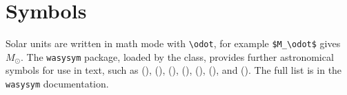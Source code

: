 \section{Symbols}
\label{sec:symbols}

Solar units are written in math mode with \verb|\odot|, for example \verb|$M_\odot$| gives $M_\odot$. The \texttt{wasysym} package, loaded by the class, provides further astronomical symbols for use in text, such as  (\sun),  (\mercury),  (\venus),  (\earth),  (\mars),  (\jupiter), and  (\saturn). The full list is in the \texttt{wasysym} documentation.
